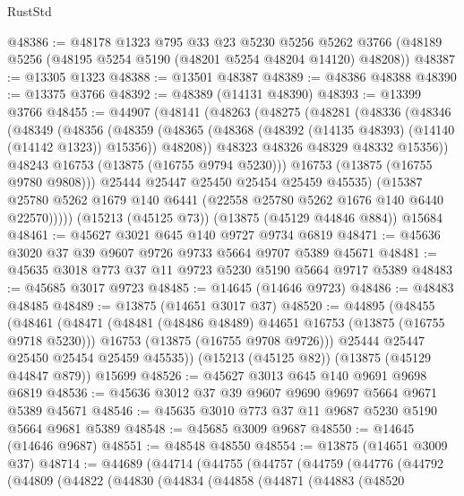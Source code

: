 \begin{lexlean}{RustStd}
\begin{coremodule}
@48386 := @48178
    @1323
    @795
    @33
    @23
    @5230
    @5256
    @5262
    @3766
    (@48189 @5256 (@48195 @5254 @5190 (@48201 @5254 @48204 @14120) @48208))
@48387 := @13305 @1323
@48388 := @13501 @48387
@48389 := @48386 @48388
@48390 := @13375 @3766
@48392 := @48389 (@14131 @48390)
@48393 := @13399 @3766
@48455 := @44907
    (@48141
      (@48263
        (@48275
          (@48281
            (@48336
              (@48346
                (@48349
                  (@48356
                    (@48359
                      (@48365
                        (@48368 (@48392 (@14135 @48393) (@14140 (@14142 @1323)) @15356))
                        @48208))
                    @48323
                    @48326
                    @48329
                    @48332
                    @15356))
                @48243
                @16753
                (@13875 (@16755 @9794 @5230)))
              @16753
              (@13875 (@16755 @9780 @9808)))
            @25444
            @25447
            @25450
            @25454
            @25459
            @45535)
          (@15387 @25780 @5262 @1679 @140 @6441 (@22558 @25780 @5262 @1676 @140 @6440 @22570)))))
    (@15213 (@45125 @73))
    (@13875 (@45129 @44846 @884))
    @15684
@48461 := @45627 @3021 @645 @140 @9727 @9734 @6819
@48471 := @45636 @3020 @37 @39 @9607 @9726 @9733 @5664 @9707 @5389 @45671
@48481 := @45635 @3018 @773 @37 @11 @9723 @5230 @5190 @5664 @9717 @5389
@48483 := @45685 @3017 @9723
@48485 := @14645 (@14646 @9723)
@48486 := @48483 @48485
@48489 := @13875 (@14651 @3017 @37)
@48520 := @44895
    (@48455
      (@48461
        (@48471
          (@48481 (@48486 @48489) @44651 @16753 (@13875 (@16755 @9718 @5230)))
          @16753
          (@13875 (@16755 @9708 @9726)))
        @25444
        @25447
        @25450
        @25454
        @25459
        @45535))
    (@15213 (@45125 @82))
    (@13875 (@45129 @44847 @879))
    @15699
@48526 := @45627 @3013 @645 @140 @9691 @9698 @6819
@48536 := @45636 @3012 @37 @39 @9607 @9690 @9697 @5664 @9671 @5389 @45671
@48546 := @45635 @3010 @773 @37 @11 @9687 @5230 @5190 @5664 @9681 @5389
@48548 := @45685 @3009 @9687
@48550 := @14645 (@14646 @9687)
@48551 := @48548 @48550
@48554 := @13875 (@14651 @3009 @37)
@48714 := @44689
    (@44714
      (@44755
        (@44757
          (@44759
            (@44776
              (@44792
                (@44809
                  (@44822
                    (@44830
                      (@44834
                        (@44858
                          (@44871
                            (@44883
                              (@48520

\end{coremodule}
\end{lexlean}
